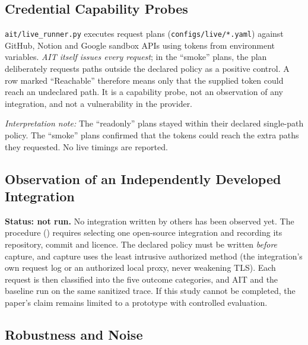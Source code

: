 \documentclass[conference]{IEEEtran}
\begin{document}
\subsection{Credential Capability Probes}
\label{sec:livesaas}

\texttt{ait/live\_runner.py} executes request plans
(\texttt{configs/live/*.yaml}) against GitHub, Notion and Google sandbox
APIs using tokens from environment variables. \emph{AIT itself issues
every request}; in the ``smoke'' plans, the plan deliberately requests
paths outside the declared policy as a positive control. A row marked
``Reachable'' therefore means only that the supplied token could reach
an undeclared path. It is a capability probe, not an observation of any
integration, and not a vulnerability in the provider.

\begin{table}[htbp]
  \caption{Credential Capability Probes (AIT-issued requests, sandbox
  accounts; not integration behavior)}
  \label{tab:live}
  \centering
  \renewcommand{\arraystretch}{1.2}
  \footnotesize
  
\end{table}

\noindent\textit{Interpretation note:} The ``readonly'' plans stayed
within their declared single-path policy. The ``smoke'' plans confirmed
that the tokens could reach the extra paths they requested. No live
timings are reported.

\subsection{Observation of an Independently Developed Integration}
\label{sec:realint}

\textbf{Status: not run.} No integration written by others has been
observed yet. The procedure ()
requires selecting one open-source integration and recording its
repository, commit and licence. The declared policy must be written
\emph{before} capture, and capture uses the least intrusive authorized
method (the integration's own request log or an authorized local
proxy, never weakening TLS). Each request is then classified into the
five outcome categories, and AIT and the baseline run on the same
sanitized trace. If this study cannot be completed, the paper's claim
remains limited to a prototype with controlled evaluation.

\subsection{Robustness and Noise}
\label{sec:robust}
\end{document}
